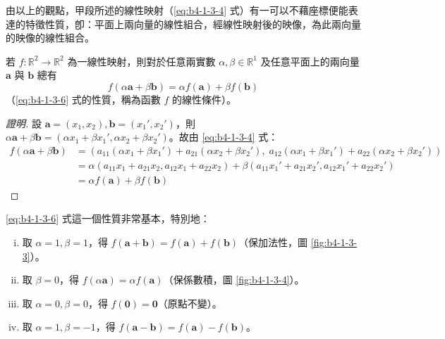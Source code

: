 由以上的觀點，甲段所述的線性映射（\eqref{eq:b4-1-3-4} 式）有一可以不藉座標便能表達的特徵性質，卽：平面上兩向量的線性組合，經線性映射後的映像，為此兩向量的映像的線性組合。

\begin{theorem}[定理 3]
若 $f: \mathbb{R}^2 \to \mathbb{R}^2$ 為一線性映射，則對於任意兩實數 $\alpha, \beta \in \mathbb{R}^1$ 及任意平面上的兩向量 $\mathbf{a}$ 與 $\mathbf{b}$ 總有
\begin{equation}
f(\alpha\mathbf{a} + \beta\mathbf{b}) = \alpha f(\mathbf{a}) + \beta f(\mathbf{b}) \label{eq:b4-1-3-6}
\end{equation}
（\eqref{eq:b4-1-3-6} 式的性質，稱為函數 $f$ 的線性條件）。
\end{theorem}

\begin{proof}[證明]
設 $\mathbf{a} = (x_1, x_2), \mathbf{b} = (x_1', x_2')$，則 $\alpha\mathbf{a} + \beta\mathbf{b} = (\alpha x_1 + \beta x_1', \alpha x_2 + \beta x_2')$。故由 \eqref{eq:b4-1-3-4} 式：
\begin{align*}
f(\alpha\mathbf{a} + \beta\mathbf{b}) &= (a_{11}(\alpha x_1 + \beta x_1') + a_{21}(\alpha x_2 + \beta x_2'), \; a_{12}(\alpha x_1 + \beta x_1') + a_{22}(\alpha x_2 + \beta x_2')) \\
&= \alpha(a_{11}x_1 + a_{21}x_2, a_{12}x_1 + a_{22}x_2) + \beta(a_{11}x_1' + a_{21}x_2', a_{12}x_1' + a_{22}x_2') \\
&= \alpha f(\mathbf{a}) + \beta f(\mathbf{b})
\end{align*}
\end{proof}

\eqref{eq:b4-1-3-6} 式這一個性質非常基本，特別地：
\begin{enumerate}[(i)]
  \item 取 $\alpha = 1, \beta = 1$，得 $f(\mathbf{a} + \mathbf{b}) = f(\mathbf{a}) + f(\mathbf{b})$（保加法性，圖 \ref{fig:b4-1-3-3}）。
  \item 取 $\beta = 0$，得 $f(\alpha\mathbf{a}) = \alpha f(\mathbf{a})$（保係數積，圖 \ref{fig:b4-1-3-4}）。
  \item 取 $\alpha = 0, \beta = 0$，得 $f(\mathbf{0}) = \mathbf{0}$（原點不變）。
  \item 取 $\alpha = 1, \beta = -1$，得 $f(\mathbf{a} - \mathbf{b}) = f(\mathbf{a}) - f(\mathbf{b})$。
\end{enumerate}


